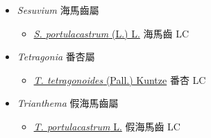 
  \begin{itemize}
 \item[] \textit{Sesuvium} 海馬齒屬
                                
  \begin{itemize}
        \item[] \href{http://www.theplantlist.org/tpl1.1/search?q=Sesuvium+portulacastrum}{\textit{S. portulacastrum} (L.) L.}   海馬齒   LC
  \end{itemize}
 \item[] \textit{Tetragonia} 番杏屬
                                
  \begin{itemize}
        \item[] \href{http://www.theplantlist.org/tpl1.1/search?q=Tetragonia+tetragonoides}{\textit{T. tetragonoides} (Pall.) Kuntze}   番杏   LC
  \end{itemize}
 \item[] \textit{Trianthema} 假海馬齒屬
                                
  \begin{itemize}
        \item[] \href{http://www.theplantlist.org/tpl1.1/search?q=Trianthema+portulacastrum}{\textit{T. portulacastrum} L.}   假海馬齒   LC
  \end{itemize}
  \end{itemize}
